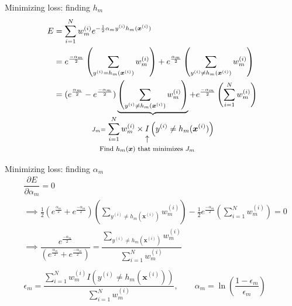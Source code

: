 \documentclass[serif, aspectratio=169]{beamer}
\makeatletter
\newcommand\vertarrowbox[3][6ex]{%
  \begin{array}[t]{@{}c@{}} #2 \\
  \left\uparrow\vcenter{\hrule height #1}\right.\kern-\nulldelimiterspace\\
  \makebox[0pt]{\scriptsize#3}
  \end{array}%
}
\makeatother
\begin{document}
\begin{frame}{Minimizing loss: finding $h_m$}
    \begin{align*}
        E &= \displaystyle\sum_{i=1}^N w_m^{(i)} e^{-\frac{1}{2}\alpha_my^{(i)}h_m(\boldsymbol{x}^{(i)})} \\
        &= e^{\frac{-\alpha_m}{2}} \left( \displaystyle\sum_{y^{(i)}=h_m(\boldsymbol{x}^{(i)})} w_m^{(i)} \right) + e^{\frac{\alpha_m}{2}} \left( \displaystyle\sum_{y^{(i)}\neq h_m(\boldsymbol{x}^{(i)})} w_m^{(i)} \right) \\
        &= (e^{\frac{\alpha_m}{2}}-e^{\frac{-\alpha_m}{2}}) \underbrace{\left(\displaystyle\sum_{y^{(i)}\neq h_m(\boldsymbol{x}^{(i)})} w_m^{(i)}\right)}_{\mathclap{J_m=\displaystyle\sum_{i=1}^Nw_m^{(i)} \times 
        \text{\vertarrowbox[2ex]{I}{\footnotesize Find $h_m(\boldsymbol{x})$ that minimizes $J_m$}}
        \left(y^{(i)} \neq h_m(\boldsymbol{x}^{(i)})\right)}} + e^{\frac{-\alpha_m}{2}} \left(\displaystyle\sum_{i=1}^Nw_m^{(i)}\right)
    \end{align*}
\end{frame}

\begin{frame}{Minimizing loss: finding $\alpha_m$}
    \begin{align*}
        &\dfrac{\partial E}{\partial \alpha_m} = 0 \\
        &\implies \frac{1}{2} (e^{\frac{\alpha_m}{2}} + e^{\frac{-\alpha_m}{2}}) \left(\displaystyle\sum_{y^{(i)}\neq h_m(\boldsymbol{x}^{(i)})} w_m^{(i)} \right) - \frac{1}{2}e^{\frac{-\alpha_m}{2}} \left(\displaystyle\sum_{i=1}^Nw_m^{(i)} \right) = 0 \\
        &\implies \dfrac{e^{\frac{-\alpha_m}{2}}}{(e^{\frac{\alpha_m}{2}} + e^{\frac{-\alpha_m}{2}})} = \dfrac{\sum_{y^{(i)}\neq h_m(\boldsymbol{x}^{(i)})} w_m^{(i)}}{\sum_{i=1}^Nw_m^{(i)}} \\ \\
        &\epsilon_m = \dfrac{\sum_{i=1}^N w_m^{(i)}I\left(y^{(i)} \neq h_m(\boldsymbol{x}^{(i)})\right)}{\sum_{i=1}^N w_m^{(i)}}, \qquad \alpha_m = \ln\left(\dfrac{1 - \epsilon_m}{\epsilon_m}\right)
    \end{align*}
\end{frame}
\end{document}
